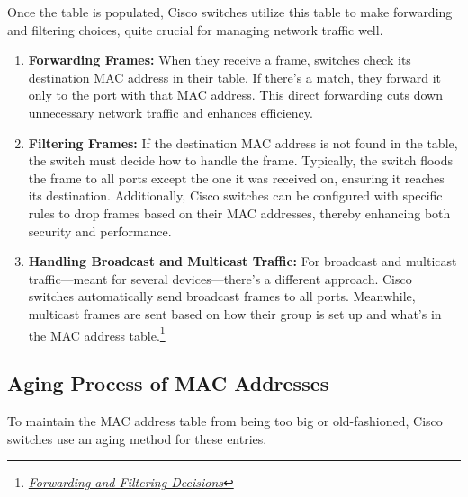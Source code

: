 \documentclass[11pt,a4paper]{article}
\begin{document}
Once the table is populated, Cisco switches utilize this table to make forwarding and filtering choices, quite crucial for managing network traffic well.
\begin{enumerate}
    
    \item \textbf{Forwarding Frames:} When they receive a frame, switches check its destination MAC address in their table. If there's a match, they forward it only to the port with that MAC address. This direct forwarding cuts down unnecessary network traffic and enhances efficiency.

    \item \textbf{Filtering Frames:} If the destination MAC address is not found in the table, the switch must decide how to handle the frame. Typically, the switch floods the frame to all ports except the one it was received on, ensuring it reaches its destination. Additionally, Cisco switches can be configured with specific rules to drop frames based on their MAC addresses, thereby enhancing both security and performance.

    \item \textbf{Handling Broadcast and Multicast Traffic:} For broadcast and multicast traffic—meant for several devices—there's a different approach. Cisco switches automatically send broadcast frames to all ports. Meanwhile, multicast frames are sent based on how their group is set up and what’s in the MAC address table.\footnote{\href{https://www.cisco.com/c/en/us/support/docs/routers/12000-series-routers/47321-ciscoef.html}{\textit{Forwarding and Filtering Decisions}}}

\end{enumerate}


\subsection*{Aging Process of MAC Addresses}

To maintain the MAC address table from being too big or old-fashioned, Cisco switches use an aging method for these entries.
\end{document}
